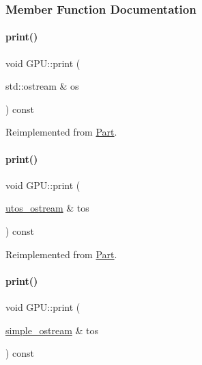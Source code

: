 \subsubsection{Member Function Documentation}
\mbox{\label{class_g_p_u_abfa2a8fa30047e9759080d724e4b3820}} 
\paragraph{\texorpdfstring{print()}{print()}\hspace{0.1cm}{\footnotesize\ttfamily [1/4]}}
{\footnotesize\ttfamily void G\+P\+U\+::print (\begin{DoxyParamCaption}\item[{std\+::ostream \&}]{os }\end{DoxyParamCaption}) const\hspace{0.3cm}{\ttfamily [virtual]}}



Reimplemented from \mbox{\hyperlink{class_part_a4fa402b8e8fd4236ff773a7697ab2bc3}{Part}}.

\mbox{\label{class_g_p_u_acfa9ab35cdf1c25c324fc39c6ffc2412}} 
\paragraph{\texorpdfstring{print()}{print()}\hspace{0.1cm}{\footnotesize\ttfamily [2/4]}}
{\footnotesize\ttfamily void G\+P\+U\+::print (\begin{DoxyParamCaption}\item[{\mbox{\hyperlink{structutos__ostream}{utos\+\_\+ostream}} \&}]{tos }\end{DoxyParamCaption}) const\hspace{0.3cm}{\ttfamily [virtual]}}



Reimplemented from \mbox{\hyperlink{class_part_a9ecabe44ba3415badf82c6a23617a41e}{Part}}.

\mbox{\label{class_g_p_u_a27cb964d5ce05efa75cb65d836b922e1}} 
\paragraph{\texorpdfstring{print()}{print()}\hspace{0.1cm}{\footnotesize\ttfamily [3/4]}}
{\footnotesize\ttfamily void G\+P\+U\+::print (\begin{DoxyParamCaption}\item[{\mbox{\hyperlink{structsimple__ostream}{simple\+\_\+ostream}} \&}]{tos }\end{DoxyParamCaption}) const\hspace{0.3cm}{\ttfamily [virtual]}}



